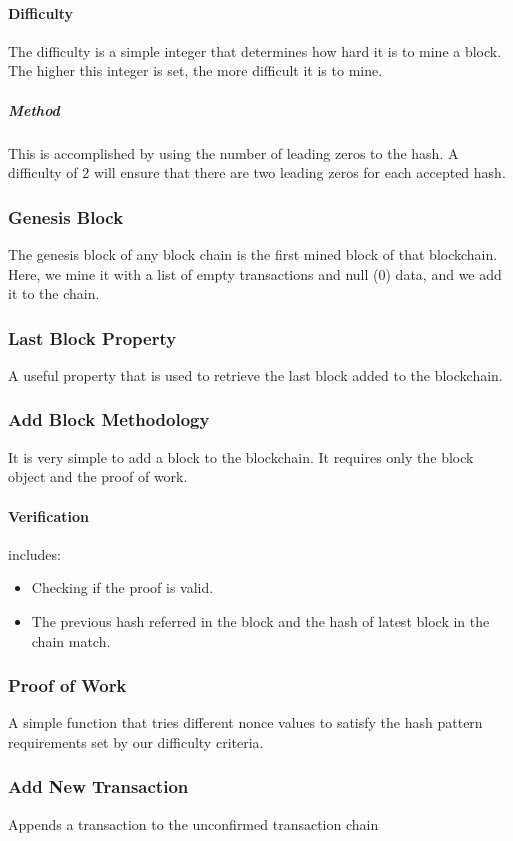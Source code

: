 \documentclass{article}
\begin{document}
\paragraph{Difficulty}
The difficulty is a simple integer that determines how hard it is to mine a block. The higher this integer is set, the more difficult it is to mine. 

\subparagraph{Method}
This is accomplished by using the number of leading zeros to the hash. A difficulty of 2 will ensure that there are two leading zeros for each accepted hash.
\subsubsection{Genesis Block}
The genesis block of any block chain is the first mined block of that blockchain. Here, we mine it with a list of empty transactions and null (0) data, and we add it to the chain.
\subsubsection{Last Block Property}
A useful property that is used to retrieve the last block added to the blockchain.
\subsubsection{Add Block Methodology}
It is very simple to add a block to the blockchain. It requires only the block object and the proof of work.
\paragraph{Verification}
includes: 
\begin{itemize}
	\item Checking if the proof is valid.
	\item The previous hash referred in the block and the hash of latest block in the chain match.
\end{itemize}
\subsubsection{Proof of Work}
A simple function that tries different nonce values to satisfy the hash pattern requirements set by our difficulty criteria.
\subsubsection{Add New Transaction}
Appends a transaction to the unconfirmed transaction chain
\end{document}
